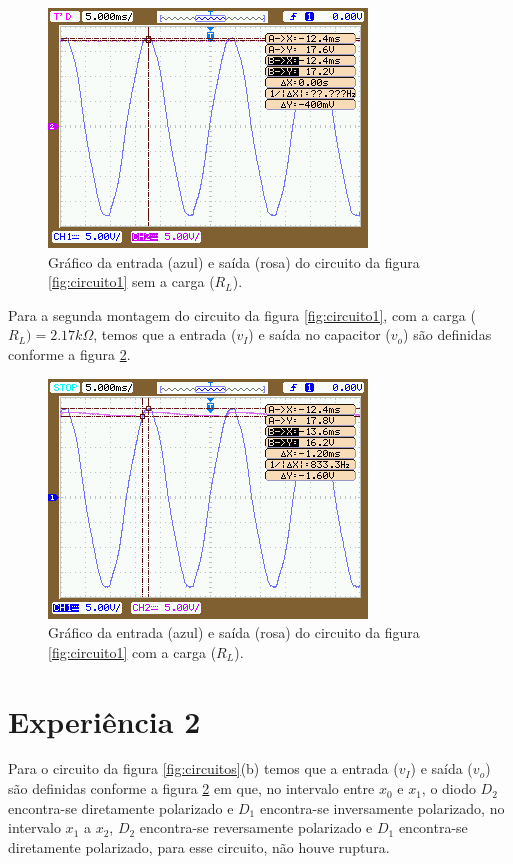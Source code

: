 \documentclass{abntex2}
\begin{document}
\begin{figure}[h]
  \centering
  \includegraphics[scale = 0.7]{exp1-1.png}
  \caption{Gráfico da entrada (azul) e saída (rosa) do circuito da figura \ref{fig:circuito1} sem a carga ($R_L$).}
  \label{fig:io1}
\end{figure}

Para a segunda montagem do circuito da figura \ref{fig:circuito1}, com a carga ($R_L) = 2.17 k\Omega$, temos que a entrada ($v_I$) e saída no capacitor ($v_o$) são definidas conforme a figura \ref{fig:io2}.

\begin{figure}[h]
  \centering
  \includegraphics[scale = 0.7]{exp1-2.png}
  \caption{Gráfico da entrada (azul) e saída (rosa) do circuito da figura \ref{fig:circuito1} com a carga ($R_L$).}
  \label{fig:io2}
\end{figure}

\pagebreak
\section{Experiência 2}

Para o circuito da figura \ref{fig:circuitos}(b) temos que a entrada ($v_I$) e saída ($v_o$) são definidas conforme a figura \ref{fig:io2}  em que, no intervalo entre $x_0$ e $x_1$, o diodo $D_2$ encontra-se diretamente polarizado e $D_1$ encontra-se inversamente polarizado, no intervalo $x_1$ a $x_2$, $D_2$ encontra-se reversamente polarizado e $D_1$ encontra-se diretamente polarizado, para esse circuito, não houve ruptura.
\end{document}
